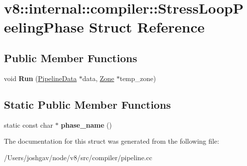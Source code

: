 \hypertarget{structv8_1_1internal_1_1compiler_1_1_stress_loop_peeling_phase}{}\section{v8\+:\+:internal\+:\+:compiler\+:\+:Stress\+Loop\+Peeling\+Phase Struct Reference}
\label{structv8_1_1internal_1_1compiler_1_1_stress_loop_peeling_phase}
\subsection*{Public Member Functions}
\begin{DoxyCompactItemize}
\item 
void {\bfseries Run} (\hyperlink{classv8_1_1internal_1_1compiler_1_1_pipeline_data}{Pipeline\+Data} $\ast$data, \hyperlink{classv8_1_1internal_1_1_zone}{Zone} $\ast$temp\+\_\+zone)\hypertarget{structv8_1_1internal_1_1compiler_1_1_stress_loop_peeling_phase_a55ce66aa4eed0fcd68012033038904b3}{}\label{structv8_1_1internal_1_1compiler_1_1_stress_loop_peeling_phase_a55ce66aa4eed0fcd68012033038904b3}

\end{DoxyCompactItemize}
\subsection*{Static Public Member Functions}
\begin{DoxyCompactItemize}
\item 
static const char $\ast$ {\bfseries phase\+\_\+name} ()\hypertarget{structv8_1_1internal_1_1compiler_1_1_stress_loop_peeling_phase_a100656f70b9e31903795eedb61f86c4d}{}\label{structv8_1_1internal_1_1compiler_1_1_stress_loop_peeling_phase_a100656f70b9e31903795eedb61f86c4d}

\end{DoxyCompactItemize}


The documentation for this struct was generated from the following file\+:\begin{DoxyCompactItemize}
\item 
/\+Users/joshgav/node/v8/src/compiler/pipeline.\+cc\end{DoxyCompactItemize}

